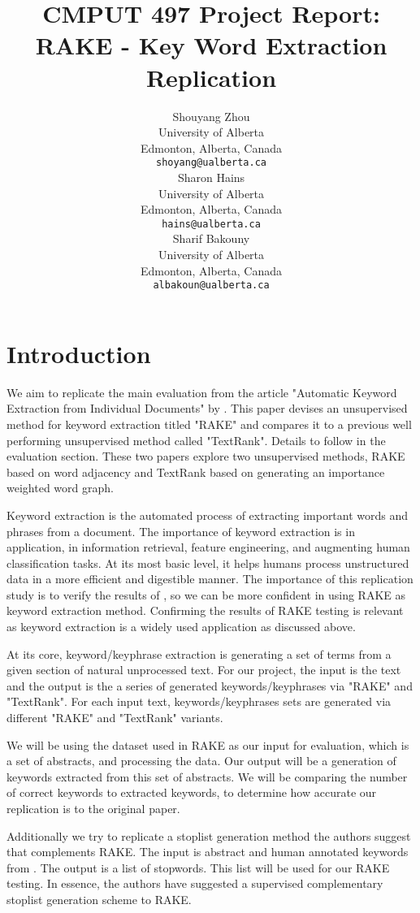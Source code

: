 \documentclass[11pt,a4paper]{article}
\title{CMPUT 497 Project Report: \\ RAKE - Key Word Extraction Replication}
\author{Shouyang Zhou \\
  University of Alberta \\
  Edmonton, Alberta, Canada \\
  {\tt shoyang@ualberta.ca} \\\And
  Sharon Hains \\
  University of Alberta \\
  Edmonton, Alberta, Canada \\
  {\tt hains@ualberta.ca} \\\And
  Sharif Bakouny\\
  University of Alberta \\
  Edmonton, Alberta, Canada \\
  {\tt albakoun@ualberta.ca} \\}
\date{}
\begin{document}
\maketitle

\section{Introduction}

We aim to replicate the main evaluation from the article "Automatic Keyword Extraction from Individual Documents" by \citet{1}. This paper devises an unsupervised method for keyword extraction titled "RAKE" and compares it to a previous well performing unsupervised method called "TextRank". Details to follow in the evaluation section. These two papers explore two unsupervised methods, RAKE based on word adjacency and TextRank based on generating an importance weighted word graph.

Keyword extraction is the automated process of extracting important words and phrases from a document. The importance of keyword extraction is in application, in information retrieval, feature engineering, and augmenting human classification tasks. At its most basic level, it helps humans process unstructured data in a more efficient and digestible manner. The importance of this replication study is to verify the results of \citet{1}, so we can be more confident in using RAKE as keyword extraction method. Confirming the results of RAKE testing is relevant as keyword extraction is a widely used application as discussed above. 

At its core, keyword/keyphrase extraction is generating a set of terms from a given section of natural unprocessed text. For our project, the input is the text and the output is the a series of generated keywords/keyphrases via "RAKE" and "TextRank". For each input text, keywords/keyphrases sets are generated via different "RAKE" and "TextRank" variants.    

We will be using the dataset used in RAKE as our input for evaluation, which is a set of abstracts, and processing the data. Our output will be a generation of keywords extracted from this set of abstracts. We will be comparing the number of correct keywords to extracted keywords, to determine how accurate our replication is to the original paper.

Additionally we try to replicate a stoplist generation method the authors suggest that complements RAKE. The input is abstract and human annotated keywords from \citep{hulth-2003-improved}. The output is a list of stopwords. This list will be used for our RAKE testing. In essence, the authors have suggested a supervised complementary stoplist generation scheme to RAKE. 
\end{document}
